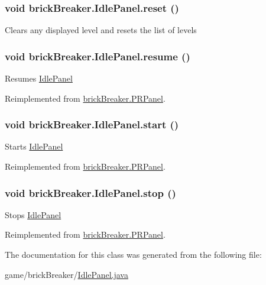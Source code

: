 \hypertarget{classbrick_breaker_1_1_idle_panel_a6d0829251befbc226224838015e9e46d}{
\subsubsection[{reset}]{\setlength{\rightskip}{0pt plus 5cm}void brickBreaker.IdlePanel.reset ()}}
\label{classbrick_breaker_1_1_idle_panel_a6d0829251befbc226224838015e9e46d}
Clears any displayed level and resets the list of levels \hypertarget{classbrick_breaker_1_1_idle_panel_ab04b565d2e626077051cefb27772a98f}{
\subsubsection[{resume}]{\setlength{\rightskip}{0pt plus 5cm}void brickBreaker.IdlePanel.resume ()}}
\label{classbrick_breaker_1_1_idle_panel_ab04b565d2e626077051cefb27772a98f}
Resumes \hyperlink{classbrick_breaker_1_1_idle_panel}{IdlePanel} 

Reimplemented from \hyperlink{classbrick_breaker_1_1_p_r_panel}{brickBreaker.PRPanel}.

\hypertarget{classbrick_breaker_1_1_idle_panel_ad391091a78283ca2546e52f967d46ed6}{
\subsubsection[{start}]{\setlength{\rightskip}{0pt plus 5cm}void brickBreaker.IdlePanel.start ()}}
\label{classbrick_breaker_1_1_idle_panel_ad391091a78283ca2546e52f967d46ed6}
Starts \hyperlink{classbrick_breaker_1_1_idle_panel}{IdlePanel} 

Reimplemented from \hyperlink{classbrick_breaker_1_1_p_r_panel}{brickBreaker.PRPanel}.

\hypertarget{classbrick_breaker_1_1_idle_panel_a2334ae977477929eeb82dbba53384360}{
\subsubsection[{stop}]{\setlength{\rightskip}{0pt plus 5cm}void brickBreaker.IdlePanel.stop ()}}
\label{classbrick_breaker_1_1_idle_panel_a2334ae977477929eeb82dbba53384360}
Stops \hyperlink{classbrick_breaker_1_1_idle_panel}{IdlePanel} 

Reimplemented from \hyperlink{classbrick_breaker_1_1_p_r_panel}{brickBreaker.PRPanel}.



The documentation for this class was generated from the following file:\begin{DoxyCompactItemize}
\item 
game/brickBreaker/\hyperlink{_idle_panel_8java}{IdlePanel.java}\end{DoxyCompactItemize}
